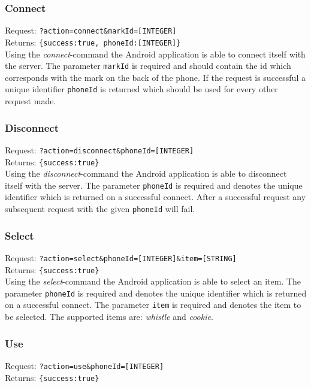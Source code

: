 \documentclass[a4paper,10pt]{report}
\begin{document}
		\subsubsection{Connect}
		Request: \texttt{?action=connect\&markId=[INTEGER]} \\
		Returns: \texttt{\{success:true, phoneId:[INTEGER]\}} \\

		\noindent Using the \emph{connect}-command the Android application is able to connect itself with the server.
		The parameter \texttt{markId} is required and should contain the id which corresponds with the mark on the back of the phone.
		If the request is successful a unique identifier \texttt{phoneId} is returned which should be used for every other request made.

		\subsubsection{Disconnect}
		Request: \texttt{?action=disconnect\&phoneId=[INTEGER]} \\
		Returns: \texttt{\{success:true\}} \\

		\noindent Using the \emph{disconnect}-command the Android application is able to disconnect itself with the server.
		The parameter \texttt{phoneId} is required and denotes the unique identifier which is returned on a successful connect.
		After a successful request any subsequent request with the given \texttt{phoneId} will fail.

		\subsubsection{Select}
		Request: \texttt{?action=select\&phoneId=[INTEGER]\&item=[STRING]} \\
		Returns: \texttt{\{success:true\}} \\

		\noindent Using the \emph{select}-command the Android application is able to select an item.
		The parameter \texttt{phoneId} is required and denotes the unique identifier which is returned on a successful connect.
		The parameter \texttt{item} is required and denotes the item to be selected. The supported items are: \emph{whistle} and \emph{cookie}.

		\subsubsection{Use}
		Request: \texttt{?action=use\&phoneId=[INTEGER]} \\
		Returns: \texttt{\{success:true\}} \\
\end{document}

